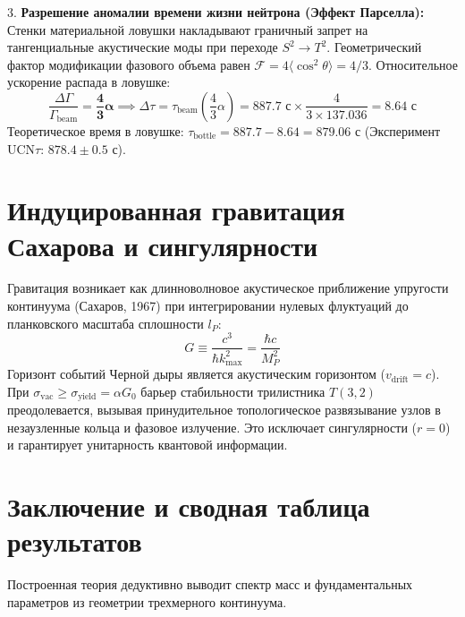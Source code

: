 \documentclass[12pt,a4paper]{article}
\begin{document}
	3. \textbf{Разрешение аномалии времени жизни нейтрона (Эффект Парселла):}
	Стенки материальной ловушки накладывают граничный запрет на тангенциальные акустические моды при переходе $S^2 \to T^2$. Геометрический фактор модификации фазового объема равен $\mathcal{F} = 4 \langle\cos^2\theta\rangle = 4/3$. Относительное ускорение распада в ловушке:
	\begin{equation}
		\frac{\Delta \Gamma}{\Gamma_{\text{beam}}} = \mathbf{\frac{4}{3}\alpha} \implies \Delta \tau = \tau_{\text{beam}} \left(\frac{4}{3}\alpha\right) = 887.7 \text{ с} \times \frac{4}{3 \times 137.036} = \mathbf{8.64 \text{ с}}
	\end{equation}
	Теоретическое время в ловушке: $\tau_{\text{bottle}} = 887.7 - 8.64 = \mathbf{879.06 \text{ с}}$ (Эксперимент $\text{UCN}\tau$: $878.4 \pm 0.5$ с).
	
	\section{Индуцированная гравитация Сахарова и сингулярности}
	
	Гравитация возникает как длинноволновое акустическое приближение упругости континуума (Сахаров, 1967) при интегрировании нулевых флуктуаций до планковского масштаба сплошности $l_P$:
	\begin{equation}
		G \equiv \frac{c^3}{\hbar k_{\text{max}}^2} = \frac{\hbar c}{M_P^2}
	\end{equation}
	Горизонт событий Черной дыры является акустическим горизонтом ($v_{\text{drift}} = c$). При $\sigma_{\text{vac}} \ge \sigma_{\text{yield}} = \alpha G_0$ барьер стабильности трилистника $T(3,2)$ преодолевается, вызывая принудительное топологическое развязывание узлов в незаузленные кольца и фазовое излучение. Это исключает сингулярности ($r=0$) и гарантирует унитарность квантовой информации.
	
	\section{Заключение и сводная таблица результатов}
	
	Построенная теория дедуктивно выводит спектр масс и фундаментальных параметров из геометрии трехмерного континуума.
	
\end{document}
